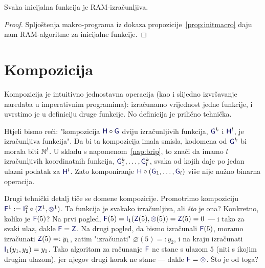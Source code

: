 \begin{korolar}[{name=[RAM-izračunljivost inicijalnih funkcija]}]\label{kor:initram}
Svaka inicijalna funkcija je RAM-izračunljiva.
\end{korolar}
\begin{proof}
Spljoštenja makro-programa iz dokaza propozicije~\ref{prop:initmacro} daju nam RAM-algoritme za inicijalne funkcije.
\end{proof}

\section{Kompozicija}

Kompozicija je intuitivno jednostavna operacija (kao i slijedno izvršavanje naredaba u imperativnim programima): izračunamo vrijednost jedne funkcije, i uvrstimo je u definiciju druge funkcije. No definicija je prilično tehnička.%

Htjeli bismo reći: "kompozicija $\f H\circ\f G$ dviju izračunljivih funkcija, $\f G^k$ i $\f H^l$, je izračunljiva funkcija". Da bi ta kompozicija imala smisla, kodomena od $\f G^k$ bi morala biti ${\mathbb N}^l$. U skladu s napomenom~\ref{nap:brip}, to znači da imamo $l$ izračunljivih koordinatnih funkcija, $\f G_1^k,\dotsc,\f G_l^k$, svaka od kojih daje po jedan ulazni podatak za $\f H^l$. Zato komponiranje $\f H\circ(\f G_1,\dotsc,\f G_l)$ više nije nužno binarna operacija.

Drugi tehnički detalj tiče se domene kompozicije. Promotrimo kompoziciju $\f F^1:=\f I_1^2\circ(\f Z^1,\varnothing^1)$. Ta funkcija je svakako izračunljiva, ali \emph{što} je ona? Konkretno, koliko je $\f F(5)$? Na prvi pogled, $\f F(5)=\f I_1(\f Z(5),\varnothing(5))=\f Z(5)=0$ --- i tako za svaki ulaz, dakle $\f F =\f Z$. Na drugi pogled, da bismo izračunali $\f F(5)$, moramo izračunati $\f Z(5)=:y_1$, zatim "izračunati" $\varnothing(5)=:y_2$, i na kraju izračunati $\f I_1(y_1,y_2)=y_1$. Tako algoritam za računanje $\f F$ ne stane s ulazom $5$ (niti s ikojim drugim ulazom), jer njegov drugi korak ne stane --- dakle $\f F=\varnothing$. Što je od toga?


